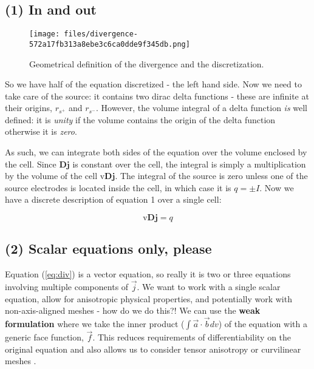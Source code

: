 \documentclass[Journal,InsideFigs,DoubleSpace,12pt,letterpaper]{ascelike-new}
\begin{document}
\subsection{(1) In and out}\label{(1) In and out}

\begin{figure}[!htbp]
\centering
\texttt{[image: files/divergence-572a17fb313a8ebe3c6ca0dde9f345db.png]}
\caption{Geometrical definition of the divergence and the discretization.}
\label{fig-div}
\end{figure}

So we have half of the equation discretized - the left hand side. Now we need to take care of the source: it contains two dirac delta functions - these are infinite at their origins, $r_{s^+}$ and $r_{s^ -}$. However, the volume integral of a delta function \textit{is} well defined: it is \textit{unity} if the volume contains the origin of the delta function otherwise it is \textit{zero}.

As such, we can integrate both sides of the equation over the volume enclosed by the cell. Since $\mathbf{D}\mathbf{j}$ is constant over the cell, the integral is simply a multiplication by the volume of the cell $\text{v} \mathbf{D} \mathbf{j}$. The integral of the source is zero unless one of the source electrodes is located inside the cell, in which case it is $q = \pm I$. Now we have a discrete description of equation 1 over a single cell:

\begin{equation}
\label{eq:div}
\text{v} \mathbf{D}\mathbf{j} = q
\end{equation}

\subsection{(2) Scalar equations only, please}\label{(2) Scalar equations only, please}

Equation (\ref{eq:div}) is a vector equation, so really it is two or three equations involving multiple components of $\vec{j}$. We want to work with a single scalar equation, allow for anisotropic physical properties, and potentially work with non-axis-aligned meshes - how do we do this?! We can use the \textbf{weak formulation} where we take the inner product ($\int \vec{a} \cdot \vec{b} dv$) of the equation with a generic face function, $\vec{f}$. This reduces requirements of differentiability on the original equation and also allows us to consider tensor anisotropy or curvilinear meshes .
\end{document}
